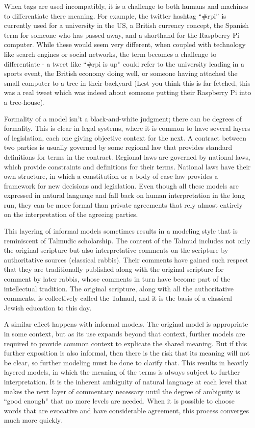 When tags are used incompatibly, it is a challenge to both humans and machines to differentiate there meaning.  For example, the twitter hashtag ``\#rpi'' is currently used for a university in the US, a British currency concept, the Spanish term for someone who has passed away, and a shorthand for the Raspberry Pi computer. 
While these would seem very different, when coupled with technology like search engines or social networks, the term becomes a challenge to differentiate - a tweet like
``\#rpi is up'' could refer to the university leading in a sports event, the British economy doing well, or someone having attached the small computer to a tree in their backyard (Lest you think this is far-fetched,  this was a real tweet which was indeed about someone putting their Raspberry Pi into a tree-house).

Formality of a model isn't a black-and-white judgment; there can be
degrees of formality. This is clear in legal systems, where it is common
to have several layers of legislation, each one giving objective context
for the next. A contract between two parties is usually governed by some
regional law that provides standard definitions for terms in the
contract. Regional laws are governed by national laws, which provide
constraints and definitions for their terms. National laws have their
own structure, in which a constitution or a body of case law provides a
framework for new decisions and legislation. Even though all these
models are expressed in natural language and fall back on human
interpretation in the long run, they can be more formal than private
agreements that rely almost entirely on the interpretation of the
agreeing parties.

This layering of informal models sometimes results in a modeling style
that is reminiscent of Talmudic scholarship. The content of the Talmud
includes not only the original scripture but also interpretative
comments on the scripture by authoritative sources (classical rabbis).
Their comments have gained such respect that they are traditionally
published along with the original scripture for comment by later rabbis,
whose comments in turn have become part of the intellectual tradition.
The original scripture, along with all the authoritative comments, is
collectively called the Talmud, and it is the basis of a classical
Jewish education to this day.

A similar effect happens with informal models. The original model is
appropriate in some context, but as its use expands beyond that context,
further models are required to provide common context to explicate the
shared meaning. But if this further exposition is also informal, then
there is the risk that its meaning will not be clear, so further
modeling must be done to clarify that. This results in heavily layered
models, in which the meaning of the terms is always subject to further
interpretation. It is the inherent ambiguity of natural language at each
level that makes the next layer of commentary necessary until the degree
of ambiguity is ``good enough'' that no more levels are needed. When it
is possible to choose words that are evocative and have considerable
agreement, this process converges much more quickly.

